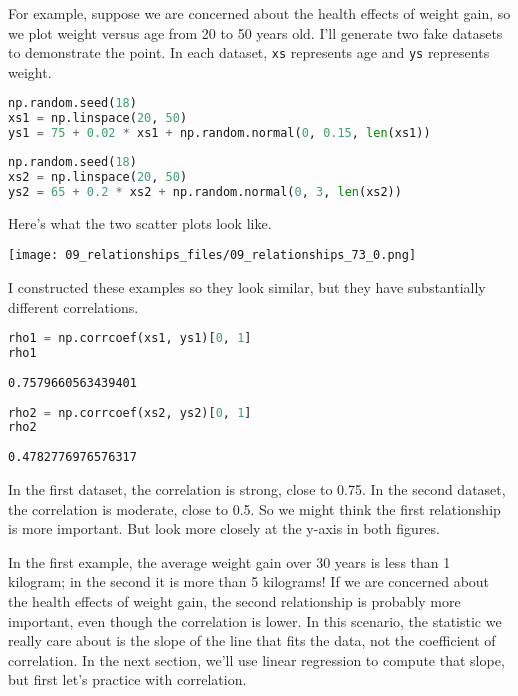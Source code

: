 For example, suppose we are concerned about the health effects of weight
gain, so we plot weight versus age from 20 to 50 years old. I'll
generate two fake datasets to demonstrate the point. In each dataset,
\passthrough{\lstinline!xs!} represents age and
\passthrough{\lstinline!ys!} represents weight.

\begin{lstlisting}[language=Python,style=source]
np.random.seed(18)
xs1 = np.linspace(20, 50)
ys1 = 75 + 0.02 * xs1 + np.random.normal(0, 0.15, len(xs1))
\end{lstlisting}

\begin{lstlisting}[language=Python,style=source]
np.random.seed(18)
xs2 = np.linspace(20, 50)
ys2 = 65 + 0.2 * xs2 + np.random.normal(0, 3, len(xs2))
\end{lstlisting}

Here's what the two scatter plots look like.



\begin{center}
\texttt{[image: 09\_relationships\_files/09\_relationships\_73\_0.png]}
\end{center}

I constructed these examples so they look similar, but they have
substantially different correlations.

\begin{lstlisting}[language=Python,style=source]
rho1 = np.corrcoef(xs1, ys1)[0, 1]
rho1
\end{lstlisting}

\begin{lstlisting}[style=output]
0.7579660563439401
\end{lstlisting}

\begin{lstlisting}[language=Python,style=source]
rho2 = np.corrcoef(xs2, ys2)[0, 1]
rho2
\end{lstlisting}

\begin{lstlisting}[style=output]
0.4782776976576317
\end{lstlisting}

In the first dataset, the correlation is strong, close to 0.75. In the
second dataset, the correlation is moderate, close to 0.5. So we might
think the first relationship is more important. But look more closely at
the y-axis in both figures.

In the first example, the average weight gain over 30 years is less than
1 kilogram; in the second it is more than 5 kilograms! If we are
concerned about the health effects of weight gain, the second
relationship is probably more important, even though the correlation is
lower. In this scenario, the statistic we really care about is the slope
of the line that fits the data, not the coefficient of correlation. In
the next section, we'll use linear regression to compute that slope, but
first let's practice with correlation.

